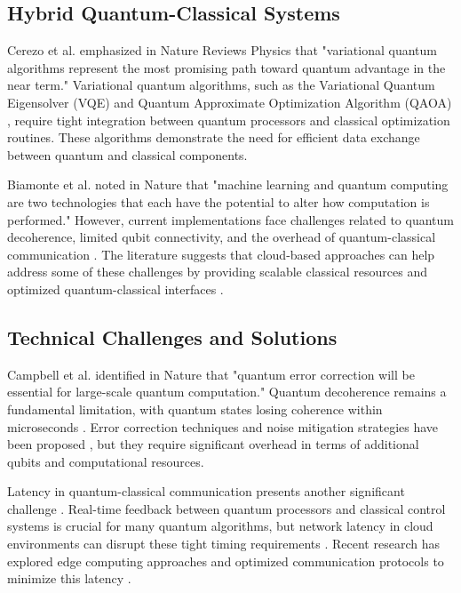 \documentclass[onecolumn]{IEEEtran}
\begin{document}
\subsection{Hybrid Quantum-Classical Systems}

Cerezo et al. \cite{cerezo2021} emphasized in Nature Reviews Physics that "variational quantum algorithms represent the most promising path toward quantum advantage in the near term." Variational quantum algorithms, such as the Variational Quantum Eigensolver (VQE) and Quantum Approximate Optimization Algorithm (QAOA) \cite{hybrid_algorithms}, require tight integration between quantum processors and classical optimization routines. These algorithms demonstrate the need for efficient data exchange between quantum and classical components.

Biamonte et al. \cite{quantum_ml} noted in Nature that "machine learning and quantum computing are two technologies that each have the potential to alter how computation is performed." However, current implementations face challenges related to quantum decoherence, limited qubit connectivity, and the overhead of quantum-classical communication \cite{preskill2018}. The literature suggests that cloud-based approaches can help address some of these challenges by providing scalable classical resources and optimized quantum-classical interfaces \cite{bharti2022}.

\subsection{Technical Challenges and Solutions}

Campbell et al. \cite{quantum_error} identified in Nature that "quantum error correction will be essential for large-scale quantum computation." Quantum decoherence remains a fundamental limitation, with quantum states losing coherence within microseconds \cite{preskill2018}. Error correction techniques and noise mitigation strategies have been proposed \cite{endo2021}, but they require significant overhead in terms of additional qubits and computational resources.

Latency in quantum-classical communication presents another significant challenge \cite{hybrid_algorithms}. Real-time feedback between quantum processors and classical control systems is crucial for many quantum algorithms, but network latency in cloud environments can disrupt these tight timing requirements \cite{cerezo2021}. Recent research has explored edge computing approaches and optimized communication protocols to minimize this latency \cite{endo2021}.
\end{document}
